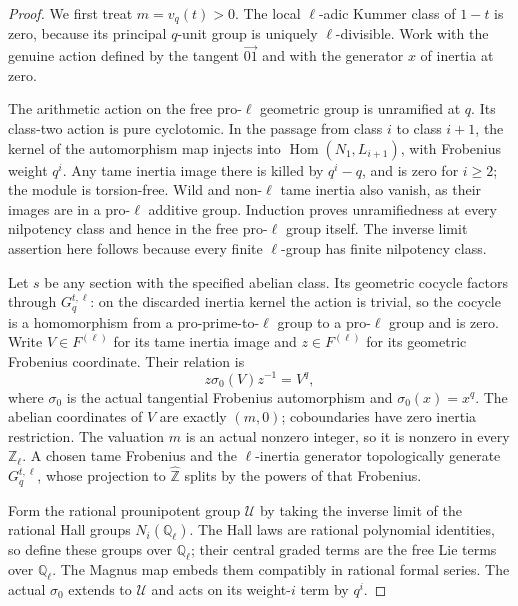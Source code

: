 \begin{proof}
We first treat \(m=v_q(t)>0\). The local
\(\ell\)-adic Kummer class of \(1-t\) is zero,
because its principal \(q\)-unit group is uniquely
\(\ell\)-divisible. Work with the genuine action
defined by the tangent \(\overrightarrow{01}\) and
with the generator \(x\) of inertia at zero.

The arithmetic action on the free pro-\(\ell\)
geometric group is unramified at \(q\). Its class-two
action is pure cyclotomic. In the passage from class
\(i\) to class \(i+1\), the kernel of the automorphism
map injects into
\(\operatorname{Hom}(N_1,L_{i+1})\), with Frobenius
weight \(q^i\). Any tame inertia image there is
killed by \(q^i-q\), and is zero for \(i\ge2\);
the module is torsion-free. Wild and non-\(\ell\)
tame inertia also vanish, as their images are in a
pro-\(\ell\) additive group. Induction proves
unramifiedness at every nilpotency class and hence
in the free pro-\(\ell\) group itself. The inverse
limit assertion here follows because every finite
\(\ell\)-group has finite nilpotency class.

Let \(s\) be any section with the specified abelian
class. Its geometric cocycle factors through
\(G_q^{t,\ell}\): on the discarded inertia kernel
the action is trivial, so the cocycle is a homomorphism
from a pro-prime-to-\(\ell\) group to a pro-\(\ell\)
group and is zero. Write \(V\in F^{(\ell)}\) for
its tame inertia image and \(z\in F^{(\ell)}\) for
its geometric Frobenius coordinate. Their relation is
\[
       z\sigma_0(V)z^{-1}=V^q,
\]
where \(\sigma_0\) is the actual tangential Frobenius
automorphism and \(\sigma_0(x)=x^q\). The abelian
coordinates of \(V\) are exactly \((m,0)\);
coboundaries have zero inertia restriction. The
valuation \(m\) is an actual nonzero integer, so
it is nonzero in every \(\mathbb Z_\ell\). A chosen
tame Frobenius and the \(\ell\)-inertia generator
topologically generate \(G_q^{t,\ell}\), whose
projection to \(\widehat{\mathbb Z}\) splits by
the powers of that Frobenius.

Form the rational prounipotent group \(\mathcal U\)
by taking the inverse limit of the rational Hall
groups \(N_i(\mathbb Q_\ell)\). The Hall laws are
rational polynomial identities, so define these
groups over \(\mathbb Q_\ell\); their central
graded terms are the free Lie terms over
\(\mathbb Q_\ell\). The Magnus map embeds them
compatibly in rational formal series. The actual
\(\sigma_0\) extends to \(\mathcal U\) and acts
on its weight-\(i\) term by \(q^i\).


\end{proof}
